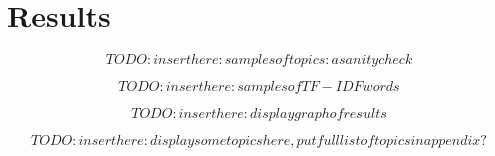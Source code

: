 \chapter{Results} \label{chp:chapter3}

\[TODO: insert here: samples of topics: a sanity check\]

\[TODO: insert here: samples of TF-IDF words\]

\[TODO: insert here: display graph of results\]

\[TODO: insert here: display some topics here, put full list of topics in appendix?\]
